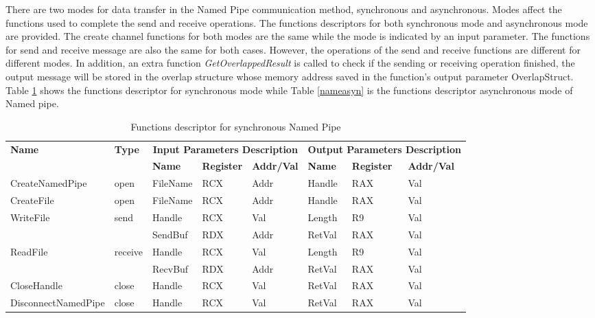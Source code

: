 \documentclass[12pt,oneside]{book}
\begin{document}
There are two modes for data transfer in the Named Pipe communication method, synchronous and asynchronous. Modes affect the functions used to complete the send and receive operations. The functions descriptors for both synchronous mode and asynchronous mode are provided. The create channel functions for both modes are the same while the mode is indicated by an input parameter. The functions for send and receive message are also the same for both cases. However, the operations of the send and receive functions are different for different modes. In addition, an extra function \textit{GetOverlappedResult} is called to check if the sending or receiving operation finished, the output message will be stored in the overlap structure whose memory address saved in the function's output parameter OverlapStruct. Table \ref{namesyn} shows the functions descriptor for synchronous mode while Table \ref{nameasyn} is the functions descriptor asynchronous mode of Named pipe.

\begin{table}[H]
  \centering
  \caption{Functions descriptor for synchronous Named Pipe}
  \label{namesyn}
  \begin{tabular}{|l|l|l|l|l|l|l|l|}
\hline
             \multirow{2}{*}{{\textbf{Name}}} & \multirow{2}{*}{{\textbf{Type}}} & \multicolumn{3}{c|}{\textbf{Input Parameters Description}} & \multicolumn{3}{c|}{\textbf{Output Parameters Description}} \\
              \cline{3-8} 
             & & \textbf{Name}& \textbf{Register} & \textbf{Addr/Val} & \textbf{Name}& \textbf{Register} &  \textbf{Addr/Val}  \\
             \hline
      CreateNamedPipe
       &open & FileName & RCX  & Addr &  Handle & RAX & Val\\
      \hline         
      CreateFile
       &open & FileName & RCX & Addr&  Handle & RAX & Val\\ 
      \hline              
      \multirow{2}{*}{WriteFile}
       &\multirow{2}{*}{send} &  Handle & RCX & Val & Length & R9 &Val\\
        \cline{3-8} 
       & & SendBuf & RDX & Addr & RetVal& RAX & Val\\
      \hline            
      \multirow{2}{*}{ReadFile}
       &\multirow{2}{*}{receive} &  Handle & RCX & Val& Length &R9 & Val\\
        \cline{3-8} 
       & & RecvBuf & RDX  & Addr & RetVal& RAX & Val\\
      \hline            
      CloseHandle &
       close &  Handle & RCX & Val & RetVal& RAX & Val\\
      \hline            
      DisconnectNamedPipe &
      close &  Handle & RCX & Val & RetVal& RAX & Val\\
      \hline               
  \end{tabular}
\end{table}
\end{document}

